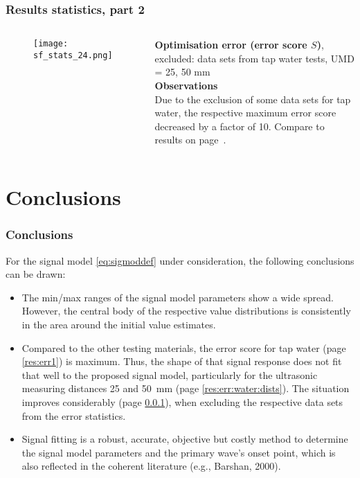 	\begin{frame}
		\frametitle{Results \textendash{} statistics, part 2}\label{res:err2}
		\begin{columns}[t]
			\begin{RIPcolleft}
				\begin{figure}
					\texttt{[image: sf\_stats\_24.png]}
				\end{figure}
			\end{RIPcolleft}
			\begin{RIPcolright}
				\textbf{Optimisation error (error score $S$)}, excluded: data sets from tap water tests, UMD = 25, 50 mm\\
				\vspace*{.5em}
				\textbf{Observations}\\
				Due to the exclusion of some data sets for tap water, the respective maximum error score decreased by a factor of 10. Compare to results on page~\pageref{res:err1}.
			\end{RIPcolright}
		\end{columns}
	\end{frame}

	\section{Conclusions}
	\begin{frame}
		\frametitle{Conclusions}
		For the signal model \eqref{eq:sigmoddef} under consideration, the following conclusions can be drawn:
		\vspace*{.5em}
		\begin{itemize}
			\item The min/max ranges of the signal model parameters show a wide spread. However, the central body of the respective value distributions is consistently in the area around the initial value estimates.
			\item Compared to the other testing materials, the error score for tap water (page \ref{res:err1}) is maximum. Thus, the shape of that signal response does not fit that well to the proposed signal model, particularly for the ultrasonic measuring distances 25 and 50~mm (page \ref{res:err:water:dists}). The situation improves considerably (page \ref{res:err2}), when excluding the respective data sets from the error statistics.
			\item Signal fitting is a robust, accurate, objective but costly method to determine the signal model parameters and the primary wave's onset point, which is also reflected in the coherent literature\autocite{barshan2000} (e.g., Barshan, 2000).
		\end{itemize}
	\end{frame}

